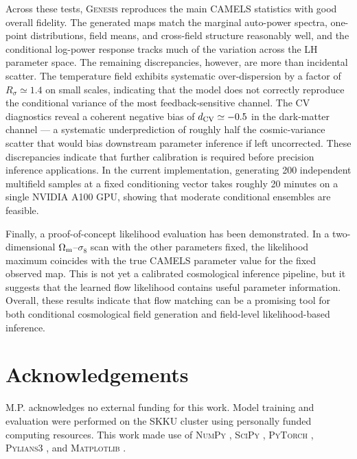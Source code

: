 \documentclass[usenatbib]{mnras}
\newcommand{\Om}{\Omega_{\rm m}}
\newcommand{\sig}{\sigma_8}
\begin{document}
Across these tests, \textsc{Genesis} reproduces the main CAMELS
statistics with good overall fidelity. The generated maps match the marginal
auto-power spectra, one-point distributions, field means, and
cross-field structure reasonably well, and the conditional log-power
response tracks much of the variation across the LH parameter space.
The remaining discrepancies, however, are more than incidental scatter.
The temperature field exhibits systematic over-dispersion by a factor of
$R_\sigma \simeq 1.4$ on small scales, indicating that the model does not
correctly reproduce the conditional variance of the most
feedback-sensitive channel. The CV diagnostics reveal a coherent negative
bias of $d_{\rm CV}\simeq -0.5$ in the dark-matter channel --- a
systematic underprediction of roughly half the cosmic-variance scatter
that would bias downstream parameter inference if left uncorrected.
These discrepancies indicate that further calibration is required
before precision inference applications. In the current implementation,
generating 200 independent multifield samples at a fixed conditioning
vector takes roughly 20 minutes on a single NVIDIA A100 GPU, showing
that moderate conditional ensembles are feasible.

Finally, a proof-of-concept likelihood evaluation has been demonstrated.
In a two-dimensional $\Om$--$\sig$ scan with the other parameters fixed,
the likelihood maximum coincides with the true CAMELS parameter value
for the fixed observed map. This is not yet a calibrated cosmological
inference pipeline, but it suggests that the learned flow likelihood
contains useful parameter information. Overall, these results indicate
that flow matching can be a promising tool for both conditional
cosmological field generation and field-level likelihood-based
inference.

\section*{Acknowledgements}

M.P. acknowledges no external funding for this work.
Model training and evaluation were performed on the SKKU cluster using
personally funded computing resources.
This work made use of
\textsc{NumPy} \citep{Harris2020},
\textsc{SciPy} \citep{Virtanen2020},
\textsc{PyTorch} \citep{Paszke2019},
\textsc{Pylians3} \citep{Villaescusa2018Pylians},
and \textsc{Matplotlib} \citep{Hunter2007}.
\end{document}
